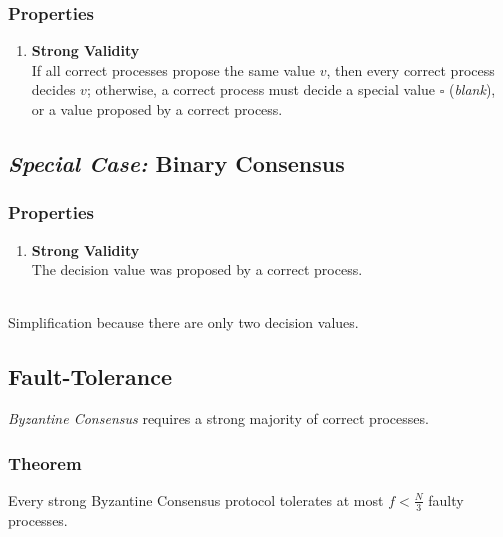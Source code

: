\documentclass{article}
\begin{document}
\begin{adjustwidth}{2em}{2em}
\begin{adjustwidth}{2em}{2em}
			\subsubsection{Properties}
			\begin{adjustwidth}{2em}{}
				\begin{enumerate}[-]
					\item \textbf{Strong Validity} \\
					If all correct processes propose the same value $v$, then every correct process decides $v$; otherwise, a correct process must decide a special value $\square$ (\textit{blank}), or a value proposed by a correct process.
				\end{enumerate}
			\end{adjustwidth}
		\end{adjustwidth}
		\subsection{\textit{Special Case:} Binary Consensus}
		\begin{adjustwidth}{2em}{2em}
			\subsubsection{Properties}
			\begin{adjustwidth}{2em}{}
				\begin{enumerate}[-]
					\item \textbf{Strong Validity} \\
					The decision value was proposed by a correct process.
				\end{enumerate}
				\hfill \\
				Simplification because there are only two decision values.
			\end{adjustwidth}
		\end{adjustwidth}
		\subsection{Fault-Tolerance}
		\begin{adjustwidth}{2em}{2em}
			\textit{Byzantine Consensus} requires a strong majority of correct processes.
			\subsubsection{Theorem}
			\begin{adjustwidth}{2em}{}
				Every strong Byzantine Consensus protocol tolerates at most $f < \frac{N}{3}$ faulty processes.
			\end{adjustwidth}

\end{adjustwidth}
\end{adjustwidth}
\end{document}
